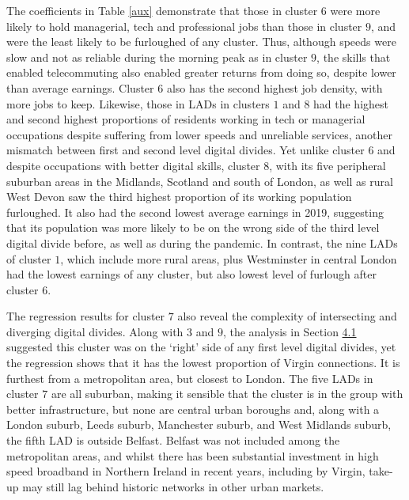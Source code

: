 \documentclass[]{interact}
\theoremstyle{plain}%
\theoremstyle{definition}
\theoremstyle{remark}
\begin{document}
The coefficients in Table \ref{aux} demonstrate that those in cluster
\(6\) were more likely to hold managerial, tech and professional jobs
than those in cluster \(9\), and were the least likely to be furloughed
of any cluster. Thus, although speeds were slow and not as reliable
during the morning peak as in cluster \(9\), the skills that enabled
telecommuting also enabled greater returns from doing so, despite lower
than average earnings. Cluster \(6\) also has the second highest job
density, with more jobs to keep. Likewise, those in LADs in clusters
\(1\) and \(8\) had the highest and second highest proportions of
residents working in tech or managerial occupations despite suffering
from lower speeds and unreliable services, another mismatch between
first and second level digital divides. Yet unlike cluster \(6\) and
despite occupations with better digital skills, cluster \(8\), with its
five peripheral suburban areas in the Midlands, Scotland and south of
London, as well as rural West Devon saw the third highest proportion of
its working population furloughed. It also had the second lowest average
earnings in 2019, suggesting that its population was more likely to be
on the wrong side of the third level digital divide before, as well as
during the pandemic. In contrast, the nine LADs of cluster \(1\), which
include more rural areas, plus Westminster in central London had the
lowest earnings of any cluster, but also lowest level of furlough after
cluster \(6\).

The regression results for cluster \(7\) also reveal the complexity of
intersecting and diverging digital divides. Along with \(3\) and \(9\),
the analysis in Section \protect\hyperlink{sec:4.1}{4.1} suggested this
cluster was on the `right' side of any first level digital divides, yet
the regression shows that it has the lowest proportion of Virgin
connections. It is furthest from a metropolitan area, but closest to
London. The five LADs in cluster \(7\) are all suburban, making it
sensible that the cluster is in the group with better infrastructure,
but none are central urban boroughs and, along with a London suburb,
Leeds suburb, Manchester suburb, and West Midlands suburb, the fifth LAD
is outside Belfast. Belfast was not included among the metropolitan
areas, and whilst there has been substantial investment in high speed
broadband in Northern Ireland in recent years, including by Virgin,
take-up may still lag behind historic networks in other urban markets.
\end{document}
